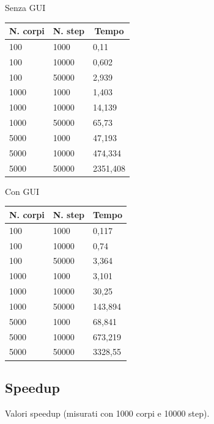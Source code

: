 \documentclass[12pt,a4paper,oneside]{article}
\begin{document}
	\hfill
	\begin{minipage}{.4\textwidth}
		Senza GUI
		
		\begin{tabular}{|l|l|l|}
			\hline
			\multicolumn{1}{|c|}{\textbf{N. corpi}} & \multicolumn{1}{c|}{\textbf{N. step}} & \multicolumn{1}{c|}{\textbf{Tempo}} \\ \hline
			100 & 1000 & 0,11 \\ \hline
			100 & 10000 & 0,602 \\ \hline
			100 & 50000 & 2,939 \\ \hline
			1000 & 1000 & 1,403 \\ \hline
			1000 & 10000 & 14,139 \\ \hline
			1000 & 50000 & 65,73 \\ \hline
			5000 & 1000 & 47,193 \\ \hline
			5000 & 10000 & 474,334 \\ \hline
			5000 & 50000 & 2351,408 \\ \hline
		\end{tabular}
	\end{minipage}
	\hfill
	\begin{minipage}{.4\textwidth}
		Con GUI
		
		\begin{tabular}{|l|l|l|}
			\hline
			\multicolumn{1}{|c|}{\textbf{N. corpi}} & \multicolumn{1}{c|}{\textbf{N. step}} & \multicolumn{1}{c|}{\textbf{Tempo}} \\ \hline
			100 & 1000 & 0,117 \\ \hline
			100 & 10000 & 0,74 \\ \hline
			100 & 50000 & 3,364 \\ \hline
			1000 & 1000 & 3,101 \\ \hline
			1000 & 10000 & 30,25 \\ \hline
			1000 & 50000 & 143,894 \\ \hline
			5000 & 1000 & 68,841 \\ \hline
			5000 & 10000 & 673,219 \\ \hline
			5000 & 50000 & 3328,55 \\ \hline
		\end{tabular}
	\end{minipage}
	\hfill

	\subsection{Speedup}
	Valori speedup (misurati con 1000 corpi e 10000 step).
	
\end{document}
